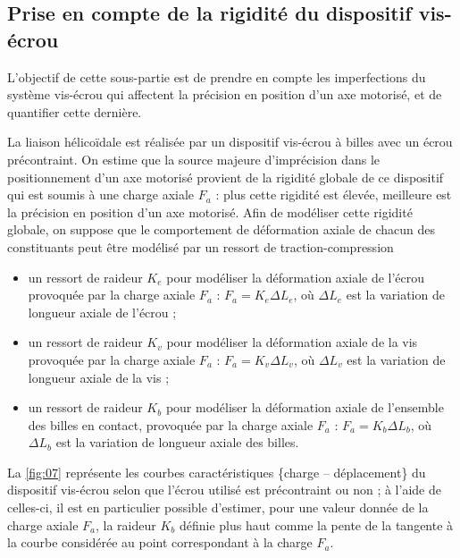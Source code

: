 \subsection{Prise en compte de la rigidité du dispositif vis-écrou}
\begin{obj}
L’objectif de cette sous-partie est de prendre en compte les imperfections du système vis-écrou qui
affectent la précision en position d’un axe motorisé, et de quantifier cette dernière.
\end{obj}

La liaison hélicoïdale est réalisée par un dispositif vis-écrou à billes avec un écrou précontraint. On estime que
la source majeure d’imprécision dans le positionnement d’un axe motorisé provient de la rigidité globale de
ce dispositif qui est soumis à une charge axiale $F_a$ : plus cette rigidité est élevée, meilleure est la précision
en position d’un axe motorisé. Afin de modéliser cette rigidité globale, on suppose que le comportement de
déformation axiale de chacun des constituants peut être modélisé par un ressort de traction-compression
\begin{itemize}
\item un ressort de raideur $K_e$ pour modéliser la déformation axiale de l’écrou provoquée par la charge axiale
$F_a$ : $F_a = K_e \Delta L_e$,  où $\Delta L_e$ est la variation de longueur axiale de l’écrou ;
\item un ressort de raideur $K_v$ pour modéliser la déformation axiale de la vis provoquée par la charge axiale $F_a$ : $F_a = K_v \Delta L_v$,  où $\Delta L_v$ est la variation de longueur axiale de la vis ;
\item un ressort de raideur $K_b$ pour modéliser la déformation axiale de l’ensemble des billes en contact, provoquée par la charge axiale $F_a$ : $F_a = K_b \Delta L_b$,  où $\Delta L_b$ est la variation de longueur axiale des billes.
\end{itemize}

\ifprof
\begin{corrige}
\end{corrige}
\else
\fi

La \autoref{fig:07} représente les courbes caractéristiques \{charge -- déplacement\} du dispositif vis-écrou selon que l’écrou utilisé est précontraint ou non ; à l’aide de celles-ci, il est en particulier possible d’estimer, pour une
valeur donnée de la charge axiale $F_a$, la raideur $K_b$ définie plus haut comme la pente de la tangente à la courbe considérée au point correspondant à la charge $F_a$.


